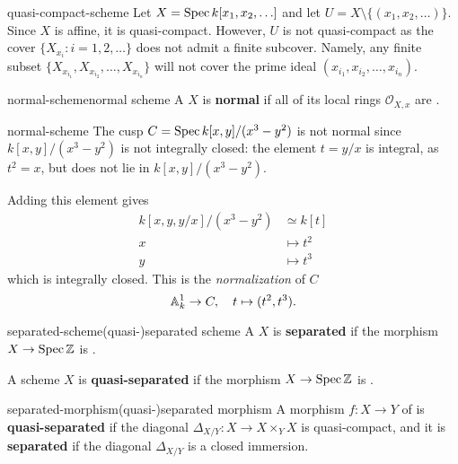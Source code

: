 \begin{example}{quasi-compact-scheme}
    Let $X = \Spec k[x_1, x_2, \ldots]$ and let $U = X \setminus \{ (x_1, x_2, \ldots) \}$. Since $X$ is affine, it is quasi-compact. However, $U$ is not quasi-compact as the cover $\{ X_{x_i} : i = 1, 2, \ldots \}$ does not admit a finite subcover. Namely, any finite subset $\{ X_{x_{i_1}}, X_{x_{i_2}}, \ldots, X_{x_{i_n}} \}$ will not cover the prime ideal $(x_{i_1}, x_{i_2}, \ldots, x_{i_n})$.
\end{example}

\begin{topic}{normal-scheme}{normal scheme}
    A  $X$ is \textbf{normal} if all of its local rings $\mathcal{O}_{X,x}$ are  .
\end{topic}

\begin{example}{normal-scheme}
    The cusp $C = \Spec k[x, y] / (x^3 - y^2)$ is not normal since $k[x, y] / (x^3 - y^2)$ is not integrally closed: the element $t = y/x$ is integral, as $t^2 = x$, but does not lie in $k[x, y] / (x^3 - y^2)$.
    
    Adding this element gives
    \[ \begin{aligned}
        k[x, y, y/x] / (x^3 - y^2) &\simeq k[t] \\
        x &\mapsto t^2 \\
        y &\mapsto t^3
    \end{aligned} \]
    which is integrally closed. This is the \textit{normalization} of $C$
    \[ \AA_k^1 \to C, \quad t \mapsto (t^2, t^3) . \]
\end{example}

\begin{topic}{separated-scheme}{(quasi-)separated scheme}
    A  $X$ is \textbf{separated} if the morphism $X \to \Spec \ZZ$ is .
    
    A scheme $X$ is \textbf{quasi-separated} if the morphism $X \to \Spec \ZZ$ is .
\end{topic}

\begin{topic}{separated-morphism}{(quasi-)separated morphism}
    A morphism $f : X \to Y$ of  is \textbf{quasi-separated} if the diagonal $\Delta_{X/Y} : X \to X \times_Y X$ is quasi-compact, and it is \textbf{separated} if the diagonal $\Delta_{X/Y}$ is a closed immersion.
\end{topic}

